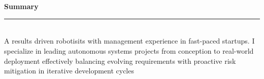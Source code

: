 \documentclass[12pt]{article}
\newcommand{\Heading}[1]{\\{\large \textbf{#1}\\[-.5em]  \rule{20cm}{.1cm} \- \vspace{-.25cm}}}
\begin{document}
%
%
\-\
%
{
\vspace*{-0.1cm}
\Heading{Summary}
{
\vspace*{-0.20cm}
\fontsize{12}{110}\selectfont
\\
A results driven robotisits with management experience in fast-paced startups. I specialize in leading autonomous systems projects from conception to real-world deployment effectively balancing evolving requirements with proactive risk mitigation in iterative development cycles%
}
\vspace*{-0.3cm}
}
\end{document}
